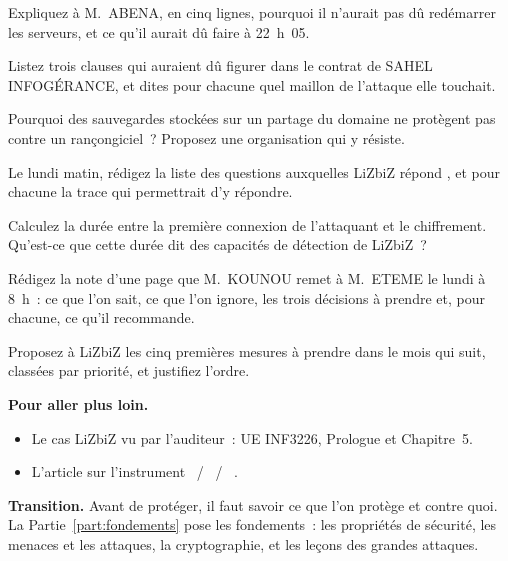 \begin{boxexo}[title={\ding{45}\quad Exercice~P.4. Le redémarrage \niveaumoyen}]
Expliquez à M.~ABENA, en cinq lignes, pourquoi il n'aurait pas dû
redémarrer les serveurs, et ce qu'il aurait dû faire à 22~h~05.
\end{boxexo}

\begin{boxexo}[title={\ding{45}\quad Exercice~P.5. Le prestataire \niveaumoyen}]
Listez trois clauses qui auraient dû figurer dans le contrat de SAHEL
INFOGÉRANCE, et dites pour chacune quel maillon de l'attaque elle
touchait.
\end{boxexo}

\begin{boxexo}[title={\ding{45}\quad Exercice~P.6. Les sauvegardes \niveaumoyen}]
Pourquoi des sauvegardes stockées sur un partage du domaine ne protègent
pas contre un rançongiciel~? Proposez une organisation qui y résiste.
\end{boxexo}

\begin{boxexo}[title={\ding{45}\quad Exercice~P.7. Ce que l'on ignore \niveaumoyen}]
Le lundi matin, rédigez la liste des questions auxquelles LiZbiZ répond
\NEK{}, et pour chacune la trace qui permettrait d'y répondre.
\end{boxexo}

\begin{boxexo}[title={\ding{45}\quad Exercice~P.8. Le temps de l'attaquant \niveaumoyen}]
Calculez la durée entre la première connexion de l'attaquant et le
chiffrement. Qu'est-ce que cette durée dit des capacités de détection de
LiZbiZ~?
\end{boxexo}

\begin{boxexo}[title={\ding{45}\quad Exercice~P.9. La note au directeur \niveauexpert}]
Rédigez la note d'une page que M.~KOUNOU remet à M.~ETEME le lundi à
8~h~: ce que l'on sait, ce que l'on ignore, les trois décisions à prendre
et, pour chacune, ce qu'il recommande.
\end{boxexo}

\begin{boxexo}[title={\ding{45}\quad Exercice~P.10. Le premier plan \niveauexpert}]
Proposez à LiZbiZ les cinq premières mesures à prendre dans le mois qui
suit, classées par priorité, et justifiez l'ordre.
\end{boxexo}

\bigskip

\begin{boxinfo}
\textbf{Pour aller plus loin.}
\begin{itemize}
    \item Le cas LiZbiZ vu par l'auditeur~: UE INF3226, Prologue et
          Chapitre~5.
    \item L'article sur l'instrument \OUI{}~/ \NON{}~/ \NEK{}~\cite{minka2026nek}.
\end{itemize}
\end{boxinfo}

\begin{boxinfo}
\textbf{Transition.} Avant de protéger, il faut savoir ce que l'on protège
et contre quoi. La Partie~\ref{part:fondements} pose les fondements~: les
propriétés de sécurité, les menaces et les attaques, la cryptographie, et
les leçons des grandes attaques.
\end{boxinfo}
